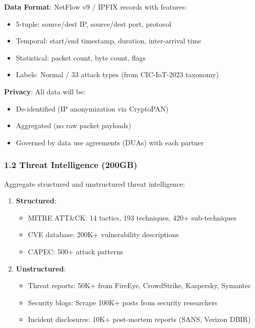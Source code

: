 \documentclass[11pt]{article}
\begin{document}
\textbf{Data Format}: NetFlow v9 / IPFIX records with features:
\begin{itemize}
    \item 5-tuple: source/dest IP, source/dest port, protocol
    \item Temporal: start/end timestamp, duration, inter-arrival time
    \item Statistical: packet count, byte count, flags
    \item Labels: Normal / 33 attack types (from CIC-IoT-2023 taxonomy)
\end{itemize}

\textbf{Privacy}: All data will be:
\begin{itemize}
    \item De-identified (IP anonymization via CryptoPAN)
    \item Aggregated (no raw packet payloads)
    \item Governed by data use agreements (DUAs) with each partner
\end{itemize}

\subsubsection{1.2 Threat Intelligence (200GB)}

Aggregate structured and unstructured threat intelligence:

\begin{enumerate}
    \item \textbf{Structured}:
    \begin{itemize}
        \item MITRE ATT\&CK: 14 tactics, 193 techniques, 420+ sub-techniques
        \item CVE database: 200K+ vulnerability descriptions
        \item CAPEC: 500+ attack patterns
    \end{itemize}

    \item \textbf{Unstructured}:
    \begin{itemize}
        \item Threat reports: 50K+ from FireEye, CrowdStrike, Kaspersky, Symantec
        \item Security blogs: Scrape 100K+ posts from security researchers
        \item Incident disclosures: 10K+ post-mortem reports (SANS, Verizon DBIR)
    \end{itemize}
\end{enumerate}
\end{document}
